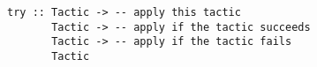 \verb+try :: Tactic -> -- apply this tactic+\\
\verb+       Tactic -> -- apply if the tactic succeeds+\\
\verb+       Tactic -> -- apply if the tactic fails+\\
\verb+       Tactic+\\



